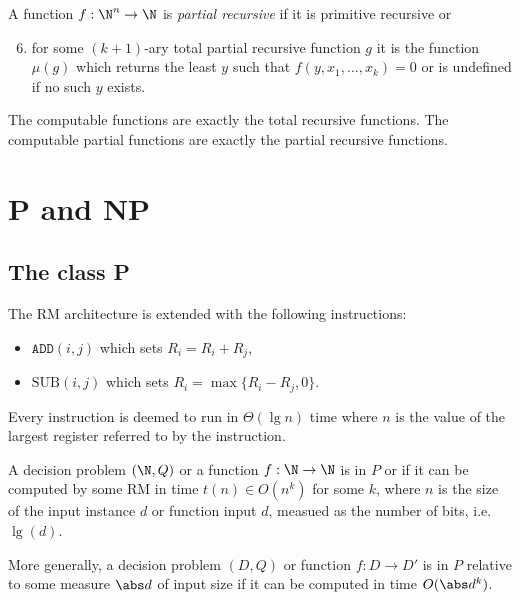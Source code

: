 \documentclass{article}
\begin{document}
\begin{definition}
    A function $f:\N^n\to\N$ is \emph{partial recursive} if it is primitive recursive or 
    \begin{enumerate}[label=R\arabic*.]
        \setcounter{enumi}{5}
        \item for some $(k+1)$-ary total partial recursive function $g$ it is the function $\mu(g)$
            which returns the least $y$ such that $f(y,x_1,...,x_k)=0$ or is undefined if no such $y$
            exists.
    \end{enumerate}
\end{definition}

\begin{theorem}[Notes I.45]
    The computable functions are exactly the total recursive functions. The computable partial functions 
    are exactly the partial recursive functions. 
\end{theorem}

\section{P and NP}

\subsection{The class P}

\begin{definition}
    The RM architecture is extended with the following instructions:
    \begin{itemize}
        \item $\texttt{ADD}(i,j)$ which sets $R_i=R_i+R_j$,
        \item $\text{SUB}(i,j)$ which sets $R_i=\max\{R_i-R_j,0\}$.
    \end{itemize}
    Every instruction is deemed to run in $\Theta(\lg n)$ time where $n$ 
    is the value of the largest register referred to by the instruction.
\end{definition}


\begin{definition}
    A decision problem $(\N,Q)$ or a function $f:\N\to\N$ is in $P$ or \ptime if 
    it can be computed by some RM in time $t(n)\in O(n^k)$ for some $k$, where $n$ is the size 
    of the input instance $d$ or function input $d$, measued as the number of bits, i.e. $\lg(d)$.

    More generally, a decision problem $(D,Q)$ or function $f:D\to D'$ is in $P$ relative to some 
    measure $\abs d$ of input size if it can be computed in time $O(\abs d^k)$.
\end{definition}
\end{document}
